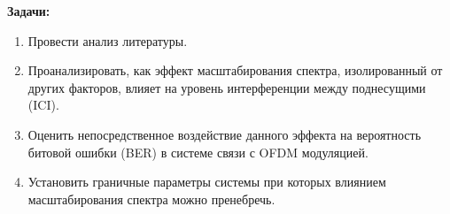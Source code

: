 \textbf{Задачи:}
\begin{enumerate}
    \item Провести анализ литературы.
    \item Проанализировать, как эффект масштабирования спектра, изолированный от других факторов,
     влияет на уровень интерференции между поднесущими (ICI).
    \item Оценить непосредственное воздействие данного эффекта на вероятность битовой ошибки (BER) в системе связи с OFDM модуляцией.
    \item Установить граничные параметры системы при которых влиянием масштабирования спектра можно пренебречь.
\end{enumerate}